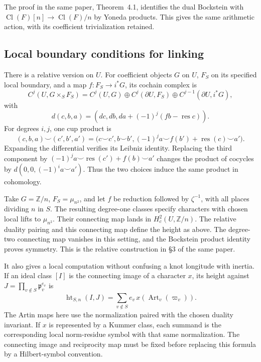 The proof in the same paper, Theorem~4.1, identifies the dual Bockstein with
\(\operatorname{Cl}(F)[n]\to\operatorname{Cl}(F)/n\) by Yoneda products.
This gives the same arithmetic action, with its coefficient trivialization
retained.

\subsection{Local boundary conditions for linking}

There is a relative version on \(U\). For coefficient objects \(G\) on
\(U\), \(F_S\) on its specified local boundary, and a map \(f:F_S\to i^*G\),
its cochain complex is
\[
 C^j(U,G\times_SF_S)
 =C^j(U,G)\oplus C^j(\partial U,F_S)
                    \oplus C^{j-1}(\partial U,i^*G),
\]
with
\[
 d(c,b,a)=(dc,db,da+(-1)^j(fb-\operatorname{res}c)).
\]
For degrees \(i,j\), one cup product is
\begin{equation}
 (c,b,a)\smile(c',b',a')
 =\bigl(c\smile c',b\smile b',
       (-1)^j a\smile f(b')+\operatorname{res}(c)\smile a'\bigr).
 \label{v4-arith:cs:eq:relative-cup}
\end{equation}
Expanding the differential verifies its Leibniz identity. Replacing the
third component by \((-1)^j a\smile\operatorname{res}(c')+f(b)\smile a'\)
changes the product of cocycles by \(d(0,0,(-1)^ia\smile a')\). Thus the two
choices induce the same product in cohomology.

Take \(G=\mathbb Z/n\), \(F_S=\mu_{n^2}\), and let \(f\) be reduction
followed by \(\zeta^{-1}\), with all places dividing \(n\) in \(S\). The
resulting degree-one classes specify characters with chosen local lifts to
\(\mu_{n^2}\). Their connecting map lands in \(H_c^2(U,\mathbb Z/n)\). The
relative duality pairing and this connecting map define the height as above.
The degree-two connecting map vanishes in this setting, and the Bockstein
product identity proves symmetry. This is the relative construction in \S3
of the same paper.

It also gives a local computation without confusing a knot longitude with
inertia. If an ideal class \([I]\) is the connecting image of a character
\(x\), its height against \(J=\prod_{v\notin S}\mathfrak p_v^{e_v}\) is
\[
 \operatorname{ht}_{S,n}(I,J)
       =\sum_{v\notin S}e_v\,x(\operatorname{Art}_v(\varpi_v)).
\]
The Artin maps here use the normalization paired with the chosen duality
invariant. If \(x\) is represented by a Kummer class, each summand is the
corresponding local norm-residue symbol with that same normalization. The
connecting image and reciprocity map must be fixed before replacing this
formula by a Hilbert-symbol convention.

